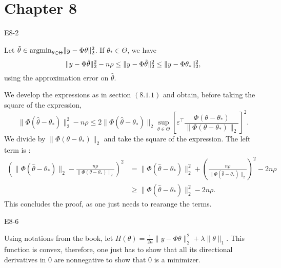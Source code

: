 \section{Chapter 8}
\begin{questions}

    \question E8-2

    \begin{solution}
        Let $\Tilde{\theta} \in \text{argmin}_{\theta \in \Theta} \|y-\Phi\theta\|_2^2$. If $\theta_* \in \Theta$, we have
        $$
        \|y - \Phi \hat{\theta}\|_2^2 - n \rho \leq \|y - \Phi \Tilde{\theta}\|_2^2 \leq \|y - \Phi \theta_*\|_2^2,
        $$
        using the approximation error on $\hat{\theta}$.
        
        We develop the expressions as in section $(8.1.1)$ and obtain, before taking the square of the expression,
        $$
        \|\Phi(\hat{\theta} - \theta_*)\|_2^2 - n \rho \leq 2 \|\Phi(\hat{\theta} - \theta_*)\|_2 \sup_{\theta \in \Theta} \left[ \varepsilon^\top \frac{\Phi (\theta - \theta_*)}{\|\Phi(\theta - \theta_*)\|_2} \right]^2.
        $$
        We divide by $\|\Phi(\theta - \theta_*)\|_2$ and take the square of the expression. The left term is :
        $$
        \begin{aligned}
            \left( \|\Phi(\hat{\theta} - \theta_*)\|_2 - \frac{n\rho}{\|\Phi(\theta - \theta_*)\|_2} \right)^2 &= \|\Phi(\hat{\theta} - \theta_*)\|_2^2 + \left( \frac{n \rho}{\|\Phi(\hat{\theta} - \theta_*)\|_2} \right)^2 - 2 n \rho \\
            &\geq \|\Phi(\hat{\theta} - \theta_*)\|_2^2 - 2 n \rho.
        \end{aligned}
        $$
        This concludes the proof, as one just needs to rearange the terms.
    \end{solution}

    \question E8-6
    \begin{solution}
       Using notations from the book, let $H(\theta) = \frac{1}{2n} \|y - \Phi \theta\|_2^2 + \lambda \|\theta\|_1$. This function is convex, therefore, one just has to show that all its  directional derivatives in $0$ are nonnegative to show that $0$ is a minimizer.


\end{solution}
\end{questions}
